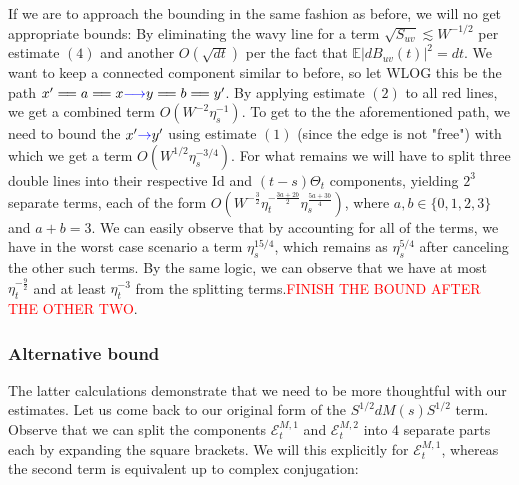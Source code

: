 \documentclass[11pt]{article}
\newcommand{\E}{\mathcal{E}}
\begin{document}
\begin{center}
\end{center}
If we are to approach the bounding in the same fashion as before, we will no get appropriate bounds: By eliminating the wavy line for a term  $\sqrt{S_{uv}}\lesssim W^{-1/2}$ per estimate $(4)$ and another $O(\sqrt{dt})$ per the fact that $\mathbb{E}\left\vert dB_{uv}(t)\right\vert^2=dt$. We want to keep a connected component similar to before, so let WLOG this be the path $x'=\!= a=\!= x\textcolor{blue}{\longrightarrow }y=\!= b=\!= y'$. By applying estimate $(2)$ to all red lines, we get a combined term $O(W^{-2}\eta_s^{-1})$. To get to the the aforementioned path, we need to bound the $x'\textcolor{blue}{\rightarrow}y'$ using estimate $(1)$ (since the edge is not "free") with which we get a term $O(W^{1/2}\eta_s^{-3/4})$. For what remains we will have to split three double lines into their respective $\text{Id}$ and $(t-s)\Theta_t$ components, yielding $2^3$ separate terms, each of the form $O\left(W^{-\frac{3}{2}}\eta_t^{-\frac{3a+2b}{2}}\eta_{s}^{\frac{5a+3b}{4}}\right)$, where $a, b\in \{0, 1, 2, 3\}$ and $a+b=3$. We can easily observe that by accounting for all of the terms, we have in the worst case scenario a term $\eta_s^{15/4}$, which remains as $\eta_s^{5/4}$ after canceling the other such terms. By the same logic, we can observe that we have at most $\eta_t^{-\frac{9}{2}}$ and at least $\eta_t^{-3}$ from the splitting terms.\textcolor{red}{FINISH THE BOUND AFTER THE OTHER TWO}.


\subsubsection*{Alternative bound}
The latter calculations demonstrate that we need to be more thoughtful with our estimates. Let us come back to our original form of the $S^{1/2}dM(s)S^{1/2}$ term. Observe that we can split the components $\E_t^{M, 1}$ and $\E_t^{M, 2}$ into 4 separate parts each by expanding the square brackets. We will this explicitly for $\mathcal{E}_{t}^{M, 1}$, whereas the second term is equivalent up to complex conjugation:
\end{document}
